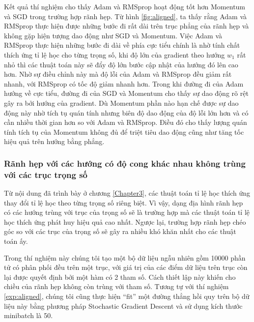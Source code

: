 Kết quả thí nghiệm cho thấy Adam và RMSprop hoạt động tốt hơn Momentum và SGD trong trường hợp rãnh hẹp. Từ hình \ref{fig:aligned}, ta thấy rằng Adam và RMSprop thực hiện được những bước đi rất dài trên trục phẳng của rãnh hẹp và không gặp hiện tượng dao động như SGD và Momentum. Việc Adam và RMSprop thực hiện những bước đi dài về phía cực tiểu chính là nhờ tính chất thích ứng tỉ lệ học cho từng trọng số, khi độ lớn của gradient theo hướng $w_1$ rất nhỏ thì các thuật toán này sẽ đẩy độ lớn bước cập nhật của hướng đó lên cao hơn. Nhờ sự điều chỉnh này mà độ lỗi của Adam và RMSprop đều giảm rất nhanh, với RMSprop có tốc độ giảm nhanh hơn. Trong khi đường đi của Adam hướng về cực tiểu, đường đi của SGD và Momentum cho thấy sự dao động rõ rệt gây ra bởi hướng của gradient. Dù Momentum phần nào hạn chế được sự dao động này nhờ tích tụ quán tính nhưng biên độ dao động của độ lỗi lớn hơn và có cần nhiều thời gian hơn so với Adam và RMSprop. Điều đó cho thấy lượng quán tính tích tụ của Momentum không đủ để triệt tiêu dao động cũng như tăng tốc hiệu quả trên hướng bằng phẳng.

\subsubsection{Rãnh hẹp với các hướng có độ cong khác nhau không trùng với các trục trọng số}
\label{exp:nonaligned}

Từ nội dung đã trình bày ở chương \ref{Chapter3}, các thuật toán tỉ lệ học thích ứng thay đổi tỉ lệ học theo từng trọng số riêng biệt. Vì vậy, dạng địa hình rãnh hẹp có các hướng trùng với trục của trọng số sẽ là trường hợp mà các thuật toán tỉ lệ học thích ứng phát huy hiệu quả cao nhất. Ngược lại, trường hợp rãnh hẹp chéo góc so với các trục của trọng số sẽ gây ra nhiều khó khăn nhất cho các thuật toán ấy.

Trong thí nghiệm này chúng tôi tạo một bộ dữ liệu ngẫu nhiên gồm 10000 phần tử có phân phối đều trên một trục, với giá trị của các điểm dữ liệu trên trục còn lại được quyết định bởi một hàm có 2 tham số. Cách thiết lập này khiến cho chiều của rãnh hẹp không còn trùng với tham số. Tương tự với thí nghiệm \ref{exp:aligned}, chúng tôi cũng thực hiện ``fit'' một đường thẳng hồi quy trên bộ dữ liệu này bằng phương pháp Stochastic Gradient Descent và sử dụng kích thước minibatch là 50.

